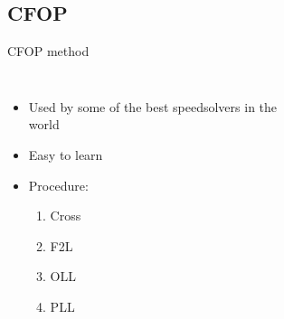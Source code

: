 \documentclass[10pt]{beamer}
\begin{document}
        \subsection{CFOP}
            \begin{frame}{CFOP method}
                \begin{columns}[c] 
                        \begin{itemize}
                            \item<2-> Used by some of the best speedsolvers in the world \pause{}
                            \item<3-> Easy to learn
                            \item<4-> Procedure:
                            \begin{enumerate}
                                \item<5-> Cross
                                \item<6-> F2L
                                \item<7-> OLL
                                \item<8-> PLL
                            \end{enumerate}
                        \end{itemize}
                        \begin{figure}
                        \end{figure}
                        \begin{figure}

\end{figure}
\end{columns}
\end{frame}
\end{document}

